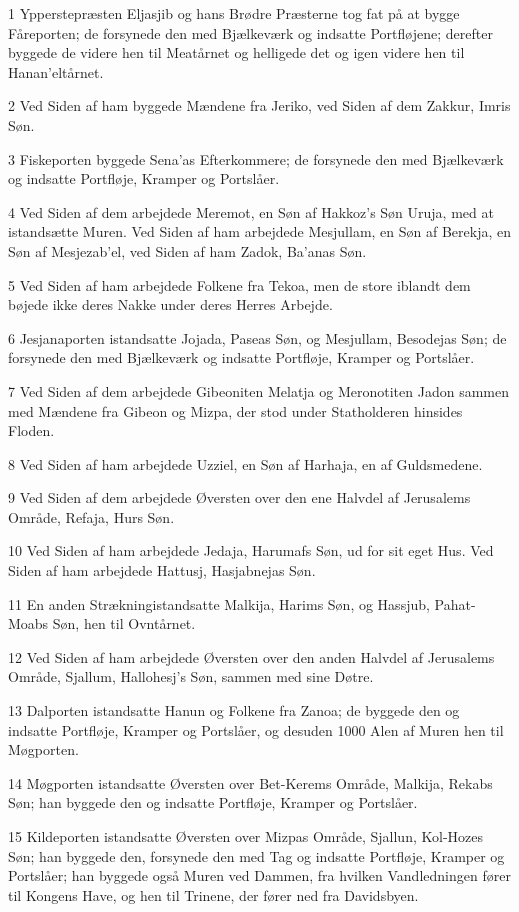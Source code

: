 \par 1 Ypperstepræsten Eljasjib og hans Brødre Præsterne tog fat på at bygge Fåreporten; de forsynede den med Bjælkeværk og indsatte Portfløjene; derefter byggede de videre hen til Meatårnet og helligede det og igen videre hen til Hanan'eltårnet.
\par 2 Ved Siden af ham byggede Mændene fra Jeriko, ved Siden af dem Zakkur, Imris Søn.
\par 3 Fiskeporten byggede Sena'as Efterkommere; de forsynede den med Bjælkeværk og indsatte Portfløje, Kramper og Portslåer.
\par 4 Ved Siden af dem arbejdede Meremot, en Søn af Hakkoz's Søn Uruja, med at istandsætte Muren. Ved Siden af ham arbejdede Mesjullam, en Søn af Berekja, en Søn af Mesjezab'el, ved Siden af ham Zadok, Ba'anas Søn.
\par 5 Ved Siden af ham arbejdede Folkene fra Tekoa, men de store iblandt dem bøjede ikke deres Nakke under deres Herres Arbejde.
\par 6 Jesjanaporten istandsatte Jojada, Paseas Søn, og Mesjullam, Besodejas Søn; de forsynede den med Bjælkeværk og indsatte Portfløje, Kramper og Portslåer.
\par 7 Ved Siden af dem arbejdede Gibeoniten Melatja og Meronotiten Jadon sammen med Mændene fra Gibeon og Mizpa, der stod under Statholderen hinsides Floden.
\par 8 Ved Siden af ham arbejdede Uzziel, en Søn af Harhaja, en af Guldsmedene.
\par 9 Ved Siden af dem arbejdede Øversten over den ene Halvdel af Jerusalems Område, Refaja, Hurs Søn.
\par 10 Ved Siden af ham arbejdede Jedaja, Harumafs Søn, ud for sit eget Hus. Ved Siden af ham arbejdede Hattusj, Hasjabnejas Søn.
\par 11 En anden Strækningistandsatte Malkija, Harims Søn, og Hassjub, Pahat-Moabs Søn, hen til Ovntårnet.
\par 12 Ved Siden af ham arbejdede Øversten over den anden Halvdel af Jerusalems Område, Sjallum, Hallohesj's Søn, sammen med sine Døtre.
\par 13 Dalporten istandsatte Hanun og Folkene fra Zanoa; de byggede den og indsatte Portfløje, Kramper og Portslåer, og desuden 1000 Alen af Muren hen til Møgporten.
\par 14 Møgporten istandsatte Øversten over Bet-Kerems Område, Malkija, Rekabs Søn; han byggede den og indsatte Portfløje, Kramper og Portslåer.
\par 15 Kildeporten istandsatte Øversten over Mizpas Område, Sjallun, Kol-Hozes Søn; han byggede den, forsynede den med Tag og indsatte Portfløje, Kramper og Portslåer; han byggede også Muren ved Dammen, fra hvilken Vandledningen fører til Kongens Have, og hen til Trinene, der fører ned fra Davidsbyen.
